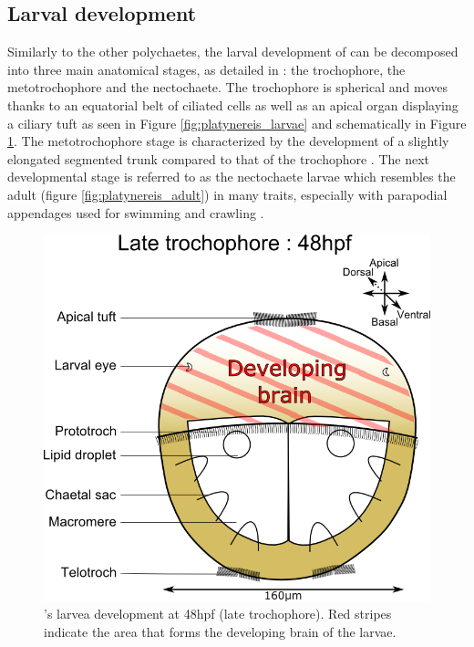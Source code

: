  
     \subsection{Larval development}
    Similarly to the other polychaetes, the larval development of \platy{} can be decomposed into three main anatomical stages, as detailed in \cite{hauenschild69}: the trochophore, the metotrochophore and the nectochaete. The trochophore is spherical and moves thanks to an equatorial belt of ciliated cells as well as an apical organ displaying a ciliary tuft \cite{rouse99,nielsen04} as seen in Figure \ref{fig:platynereis_larvae} and schematically in Figure \ref{fig:platynereis_larvae_scheme}. The metotrochophore stage is characterized by the development of a slightly elongated segmented trunk compared to that of the trochophore \cite{hacker98}. The next developmental stage is referred to as the nectochaete larvae which resembles the adult (figure \ref{fig:platynereis_adult}) in many traits, especially with parapodial appendages used for swimming and crawling \cite{hacker98}.\\
    
\begin{figure}[bth]
\begin{center}
  \includegraphics[width=\linewidth]{gfx/chapter1/larvae48hpf.png}
\end{center}
  \caption{\platyfull{}'s larvea development at 48hpf (late trochophore). Red stripes indicate the area that forms the developing brain of the larvae.}
  \label{fig:platynereis_larvae_scheme}
\end{figure}
    
